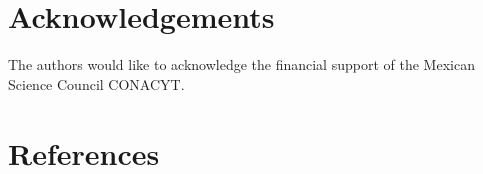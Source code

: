 
\section*{Acknowledgements}
The authors would like to acknowledge the financial support of
the Mexican Science Council CONACYT.

\section*{References}

%

